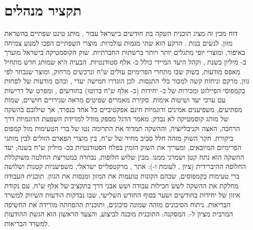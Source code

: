 \chapter*{תקציר מנהלים}

דוח מכין זה מציג תוכנית השקה בת  חודשים בישראל עבור , מותג
טינט שפתיים בהשראת מזון, לנשים בנות . הרקע הוא שתי מגמות עולמיות:
מוצרי השפתיים הפכו למנוע צמיחה באיפור, ומוצרי יופי מתגלים יותר ויותר ברשתות
החברתיות. שוק הקוסמטיקה בישראל מוערך ב- מיליון בשנת ,
וקהל היעד המיידי כולל כ- אלף סטודנטיות. הבעיה היא שמותג חדש מתחיל
מאפס מודעות, בשוק שבו מתחרי הפרימיום עולים  ש"ח ונרכשים מרחוק,
ומוצר שנבחר לפי גוון, מרקם וניחוח קשה למכור בלי התנסות. לכן הוגדרו חמישה יעדי
, ובהם מודעות של  לפחות בקמפוסי הפיילוט ומכירות של כ-
יחידות (כ- אלף ש"ח ברוטו) בחודשים , ומפרט של  דרישות עם ערכי יעד ושיטות אימות.
סקירת  מאמרים שפיטים מראה שגירויים חושיים, שמות מפתיעים, משפיענים
אמינים ודוגמיות חינם אפקטיביים כל אחד בנפרד, אך שילובם בהשקה של מותג קוסמטיקה
לא נבדק; מאמר הדגל מספק מודל למדידת השפעת הדוגמיות דרך הרחבה, האצה
וקניבליזציה, וההשקה תמדוד את התרומה נטו של ברי הטעימות מול קמפוס ביקורת. חקר
השוק מזהה חלל  סביב מחיר של  ש"ח, בין מוצרי הפארם הזולים
לבין מותגי הפרימיום המיובאים, ומעריך את השוק הזמין בפלח הסטודנטיות בכ-
מיליון ש"ח בשנה; יעד ההשקה הוא נתח קטן ושמרני ממנו. מבין שלוש חלופות, נבחרה
במטריצת החלטה משוקללת החלופה ההיברידית (ציון , לעומת 
ו-): אתר , מרקטפלייס ישראלי,  משפיעניות קטנות
ושלושה ברי טעימות בקמפוסים, שבהם הקונות טועמות את המזון ומנסות את הגוון.
תוכנית העבודה מחלקת את ההשקה לשש חבילות עבודה ושש אבני דרך בתקציב של 
אלף ש"ח, עם נקודת איזון של  יחידות בחודשים  ושער
 בסוף החודש השלישי, שבו נבדקות הודעות השיווק
למשרד הבריאות. ניתוח הסיכונים מזהה שמונה סיכונים, ותוכנית ההפחתה מורידה את
החשיפה המרבית מציון  ל-. המסקנה: התוכנית מוכנה לביצוע, והצעד
הראשון הוא הגשת ההודעות למשרד הבריאות.

